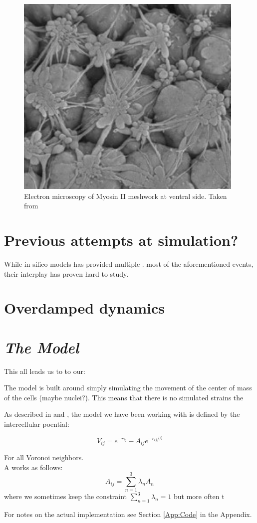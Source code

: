 \begin{figure}[H]
    \centering
    \includegraphics[width=0.6\linewidth]{chapters/Theory/figures/EM_constricting_proteins.png}
    \caption{Electron microscopy of Myosin II meshwork at ventral side. Taken from \cite{martin2010integration}}
    \label{fig:enter-label}
\end{figure}

\section{Previous attempts at simulation?}
While in silico models has provided multiple . most of the aforementioned events, their interplay has proven hard to study. 





\section{Overdamped dynamics}

\section{\textit{The Model}}
This all leads us to to our:


The model is built around simply simulating the movement of the center of mass of the cells (maybe nuclei?). This means that there is no simulated strains the


As described in \cite{} and \cite{}, the model we have been working with is defined by the intercellular poential:

\begin{equation}
    V_{ij}=e^{-r_{ij}}-A_{ij}e^{-r_{ij}/\beta}
\end{equation}

For all Voronoi neighbors.\\

A works as follows:
\begin{equation}
    A_{ij}=\sum_{n=1}^{3}\lambda_n A_n
\end{equation}
where we sometimes keep the constraint $\sum_{n=1}^{3}\lambda_n=1$ but more often t



For notes on the actual implementation see Section \ref{App:Code} in the Appendix.